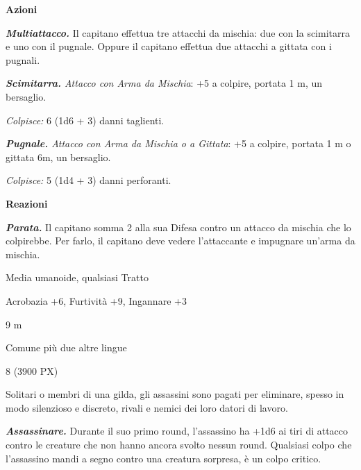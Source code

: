 \begin{multicols}{2}
{\textbf{Azioni}

\emph{\textbf{Multiattacco.}} Il capitano effettua tre attacchi da mischia: due con la scimitarra e uno con il pugnale. Oppure il capitano effettua due attacchi a gittata con i pugnali.

\emph{\textbf{Scimitarra.} Attacco con Arma da Mischia}: +5 a colpire, portata 1 m, un bersaglio.

\emph{Colpisce:} 6 (1d6 + 3) danni taglienti.

\emph{\textbf{Pugnale.} Attacco con Arma da Mischia o a Gittata}: +5 a colpire, portata 1 m o gittata 6m, un bersaglio.

\emph{Colpisce:} 5 (1d4 + 3) danni perforanti.

\textbf{Reazioni}

\emph{\textbf{Parata.}} Il capitano somma 2 alla sua Difesa contro un attacco da mischia che lo colpirebbe. Per farlo, il capitano deve vedere l'attaccante e impugnare un'arma da mischia.

\begin{description}[noitemsep, topsep=0pt, parsep=0pt, partopsep=0pt, itemsep=1pt, leftmargin=2.35cm,  labelwidth=2.2cm, itemindent=0cm, listparindent=0pt] %
\setlength{\baselineskip}{10pt}
\item[\textbf{Taglia/Tipo}] Media umanoide, qualsiasi Tratto
\item[\textbf{Caratt.}] 
\item[\textbf{Punti Ferita}] 
\item[\textbf{Comp.}] Acrobazia +6, Furtività +9, Ingannare +3
\item[\textbf{Tiri Salvez.}] 
\item[\textbf{Movimento}] 9 m
\item[\textbf{Linguaggi}] Comune più due altre lingue
\item[\textbf{Sfida}] 8 (3900 PX)
\end{description}
\smallskip

Solitari o membri di una gilda, gli assassini sono pagati per eliminare, spesso in modo silenzioso e discreto, rivali e nemici dei loro datori di lavoro.

\emph{\textbf{Assassinare.}} Durante il suo primo round, l'assassino ha +1d6 ai tiri di attacco contro le creature che non hanno ancora svolto nessun round. Qualsiasi colpo che l'assassino mandi a segno contro una creatura sorpresa, è un colpo critico.

}
\end{multicols}

